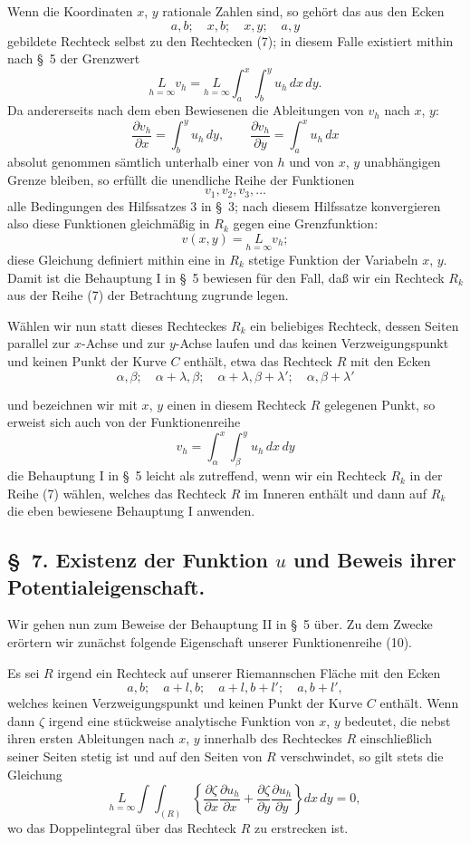 \documentclass{article}
\begin{document}
Wenn die Koordinaten $x$, $y$ rationale Zahlen sind, so gehört das aus den Ecken
\[
a, b; \quad x, b; \quad x, y; \quad a, y
\]
gebildete Rechteck selbst zu den Rechtecken (7); in diesem Falle existiert mithin nach §~5 der Grenzwert
\[
\underset{h=\infty}{L} v_h = \underset{h=\infty}{L} \int_a^x \int_b^y u_h\,dx\,dy.
\]
Da andererseits nach dem eben Bewiesenen die Ableitungen von $v_h$ nach $x$, $y$:
\[
\frac{\partial v_h}{\partial x} = \int_b^y u_h\,dy, \qquad \frac{\partial v_h}{\partial y} = \int_a^x u_h\,dx
\]
absolut genommen sämtlich unterhalb einer von $h$ und von $x$, $y$ unabhängigen Grenze bleiben, so erfüllt die unendliche Reihe der Funktionen
\[
v_1, v_2, v_3, \dots
\]
alle Bedingungen des Hilfssatzes 3 in §~3; nach diesem Hilfssatze konvergieren also diese Funktionen gleichmäßig in $R_k$ gegen eine Grenzfunktion:
\[
v(x, y) = \underset{h=\infty}{L} v_h;
\]
diese Gleichung definiert mithin eine in $R_k$ stetige Funktion der Variabeln $x$, $y$. Damit ist die Behauptung I in §~5 bewiesen für den Fall, daß wir ein Rechteck $R_k$ aus der Reihe (7) der Betrachtung zugrunde legen.

Wählen wir nun statt dieses Rechteckes $R_k$ ein beliebiges Rechteck, dessen Seiten parallel zur $x$-Achse und zur $y$-Achse laufen und das keinen Verzweigungspunkt und keinen Punkt der Kurve $C$ enthält, etwa das Rechteck $R$ mit den Ecken
\[
\alpha, \beta; \quad \alpha+\lambda, \beta; \quad \alpha+\lambda, \beta+\lambda'; \quad \alpha, \beta+\lambda'
\]

und bezeichnen wir mit $x$, $y$ einen in diesem Rechteck $R$ gelegenen Punkt, so erweist sich auch von der Funktionenreihe
\[
v_h = \int_\alpha^x \int_\beta^y u_h\,dx\,dy
\]
die Behauptung I in §~5 leicht als zutreffend, wenn wir ein Rechteck $R_k$ in der Reihe (7) wählen, welches das Rechteck $R$ im Inneren enthält und dann auf $R_k$ die eben bewiesene Behauptung I anwenden.

\subsection*{§~7. Existenz der Funktion $u$ und Beweis ihrer Potentialeigenschaft.}

Wir gehen nun zum Beweise der Behauptung II in §~5 über. Zu dem Zwecke erörtern wir zunächst folgende Eigenschaft unserer Funktionenreihe (10).

Es sei $R$ irgend ein Rechteck auf unserer Riemannschen Fläche mit den Ecken
\[
a, b; \quad a+l, b; \quad a+l, b+l'; \quad a, b+l',
\]
welches keinen Verzweigungspunkt und keinen Punkt der Kurve $C$ enthält. Wenn dann $\zeta$ irgend eine stückweise analytische Funktion von $x$, $y$ bedeutet, die nebst ihren ersten Ableitungen nach $x$, $y$ innerhalb des Rechteckes $R$ einschließlich seiner Seiten stetig ist und auf den Seiten von $R$ verschwindet, so gilt stets die Gleichung
\[
\underset{h=\infty}{L} \int\!\!\int_{(R)} \left\{ \frac{\partial\zeta}{\partial x} \frac{\partial u_h}{\partial x} + \frac{\partial\zeta}{\partial y} \frac{\partial u_h}{\partial y} \right\} dx\,dy = 0, \tag{11}
\]
wo das Doppelintegral über das Rechteck $R$ zu erstrecken ist.
\end{document}
